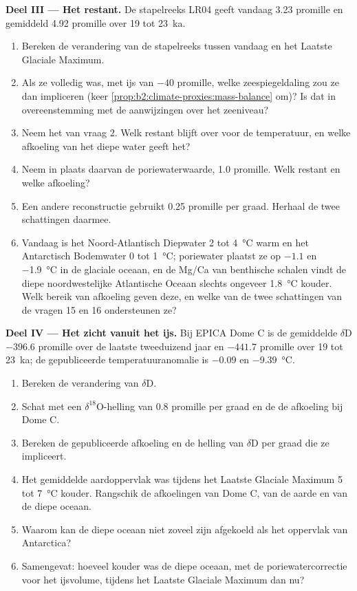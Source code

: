 \begin{problem}
\medskip\noindent\textbf{Deel III --- Het restant.}
De stapelreeks LR04 geeft vandaag \num{3.23} promille en gemiddeld \num{4.92} promille over 19 tot
\qty{23}{ka}.
\begin{enumerate}[resume]
  \item Bereken de verandering van de stapelreeks tussen vandaag en het Laatste Glaciale Maximum.
  \item Als ze volledig  was, met ijs van $-40$ promille, welke zeespiegeldaling zou ze dan
        impliceren (keer \cref{prop:b2:climate-proxies:mass-balance} om)? Is dat in overeenstemming met de
        aanwijzingen over het zeeniveau?
  \item Neem het  van vraag 2. Welk restant blijft over voor de temperatuur, en
        welke afkoeling van het diepe water geeft het?
  \item Neem in plaats daarvan de poriewaterwaarde, \num{1.0} promille. Welk restant en welke afkoeling?
  \item Een andere reconstructie gebruikt \num{0.25} promille per graad. Herhaal de twee schattingen daarmee.
  \item Vandaag is het Noord-Atlantisch Diepwater 2 tot \qty{4}{\celsius} warm en het Antarctisch
        Bodemwater 0 tot \qty{1}{\celsius}; poriewater plaatst ze op $-1.1$ en \qty{-1.9}{\celsius}
        in de glaciale oceaan, en de Mg/Ca van benthische schalen vindt de diepe noordwestelijke Atlantische Oceaan
        slechts ongeveer \qty{1.8}{\celsius} kouder. Welk bereik van afkoeling geven deze, en welke van de
        twee schattingen van de vragen 15 en 16 ondersteunen ze?
\end{enumerate}

\medskip\noindent\textbf{Deel IV --- Het zicht vanuit het ijs.}
Bij EPICA Dome C is de gemiddelde $\delta$D $-396.6$ promille over de laatste tweeduizend jaar en
$-441.7$ promille over 19 tot \qty{23}{ka}; de gepubliceerde temperatuuranomalie is $-0.09$ en
\qty{-9.39}{\celsius}.
\begin{enumerate}[resume]
  \item Bereken de verandering van $\delta$D.
  \item Schat met een $\delta^{18}$O-helling van \num{0.8} promille per graad en de 
        de afkoeling bij Dome C.
  \item Bereken de gepubliceerde afkoeling en de helling van $\delta$D per graad die ze impliceert.
  \item Het gemiddelde aardoppervlak was tijdens het Laatste Glaciale Maximum 5 tot \qty{7}{\celsius} kouder.
        Rangschik de afkoelingen van Dome C, van de aarde en van de diepe oceaan.
  \item Waarom kan de diepe oceaan niet zoveel zijn afgekoeld als het oppervlak van Antarctica?
  \item Samengevat: hoeveel kouder was de diepe oceaan, met de poriewatercorrectie voor het ijsvolume,
        tijdens het Laatste Glaciale Maximum dan nu?
\end{enumerate}
\end{problem}
